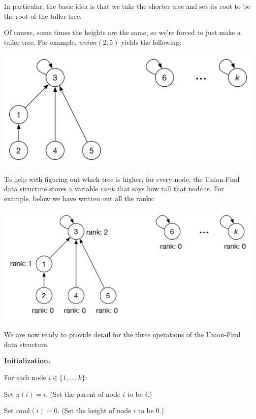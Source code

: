 In particular, the basic idea is that we take the shorter tree and set its root to be the root of the taller tree.

Of course, some times the heights are the same, so we're forced to just make a taller tree. For example, $union(2,5)$ yields the following:

{\centering\includegraphics[scale=0.4]{images_union-find5} \par}

To help with figuring out which tree is higher, for every node, the Union-Find data structure stores a variable $rank$ that says how tall that node is. For example, below we have written out all the ranks:

{\centering\includegraphics[scale=0.4]{images_union-find6} \par}

We are now ready to provide detail for the three operations of the Union-Find data structure.

\textbf{Initialization.}

\-\hspace{7mm} For each node $i\in \{ 1,\dots ,k\}$:

\-\hspace{12mm} Set $\pi(i)=i$. (Set the parent of node $i$ to be $i$.)

\-\hspace{12mm} Set $rank(i)=0$. (Set the height of node $i$ to be 0.)

